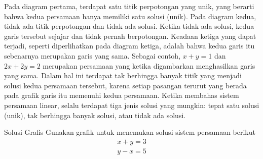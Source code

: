 Pada diagram pertama, terdapat satu titik
perpotongan yang unik, yang berarti bahwa kedua persamaan hanya memiliki satu solusi (unik).
Pada diagram kedua, tidak ada titik perpotongan dan tidak ada solusi. Ketika tidak ada solusi, kedua garis tersebut sejajar dan tidak pernah berpotongan.
Keadaan ketiga yang dapat terjadi, seperti diperlihatkan pada diagram ketiga, adalah bahwa kedua garis itu sebenarnya merupakan garis yang sama. Sebagai
contoh, $x+y=1$ dan $2x+2y=2$ merupakan persamaan yang ketika digambarkan menghasilkan
garis yang sama. Dalam hal ini terdapat tak berhingga banyak titik yang menjadi
solusi kedua persamaan tersebut, karena setiap pasangan terurut yang berada pada grafik
garis itu memenuhi kedua persamaan.
Ketika membahas sistem persamaan linear, selalu terdapat tiga jenis solusi yang mungkin: tepat satu solusi (unik),
tak berhingga banyak solusi, atau tidak ada solusi.

\begin{example}{Solusi Grafis}\label{exa:graphicalsoln}
Gunakan grafik untuk menemukan solusi sistem persamaan berikut \:
\begin{equation*}
\begin{array}{c}
x+y=3 \\
y-x=5
\end{array}
\end{equation*}
\end{example} 

